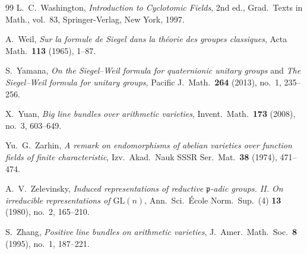 \begin{thebibliography}{99}
L.~C.~Washington,
\emph{Introduction to Cyclotomic Fields},
2nd ed., Grad.\ Texts in Math., vol.~83, Springer-Verlag, New York, 1997.

A.~Weil,
\emph{Sur la formule de Siegel dans la th\'eorie des groupes classiques},
Acta Math.\ \textbf{113} (1965), 1--87.

S.~Yamana,
\emph{On the Siegel--Weil formula for quaternionic unitary groups} and \emph{The Siegel--Weil formula for unitary groups},
Pacific J.\ Math.\ \textbf{264} (2013), no.~1, 235--256.

X.~Yuan,
\emph{Big line bundles over arithmetic varieties},
Invent.\ Math.\ \textbf{173} (2008), no.~3, 603--649.

Yu.~G.~Zarhin,
\emph{A remark on endomorphisms of abelian varieties over function fields of finite characteristic},
Izv.\ Akad.\ Nauk SSSR Ser.\ Mat.\ \textbf{38} (1974), 471--474.

A.~V.~Zelevinsky,
\emph{Induced representations of reductive $\mathfrak{p}$-adic groups. II. On irreducible representations of $\mathrm{GL}(n)$},
Ann.\ Sci.\ \'Ecole Norm.\ Sup.\ (4) \textbf{13} (1980), no.~2, 165--210.

S.~Zhang,
\emph{Positive line bundles on arithmetic varieties},
J.\ Amer.\ Math.\ Soc.\ \textbf{8} (1995), no.~1, 187--221.

\end{thebibliography}
